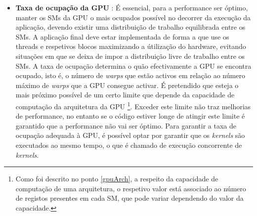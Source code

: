 \begin{itemize}
\item{\textbf{Taxa de ocupação da GPU}} :
É essencial, para a performance ser óptimo, manter os SMs da GPU o mais ocupados possível no decorrer da execução da aplicação, devendo existir uma distribuição de trabalho equilibrada entre os SMs. A aplicação final deve estar implementada de forma a que use os threads e respetivos blocos maximizando a útilização do hardware, evitando situações em que se deixa de impor a distribuição livre de trabalho entre os SMs.
A taxa de ocupação determina o quão efectivamente a GPU se encontra ocupado, isto é, o número de \textit{warps} que estão activos em relação ao número máximo de \textit{warps} que a GPU consegue activar. É pretendido que esteja o mais próximo possível de um certo limite que depende da capacidade de computação da arquitetura da GPU \footnote[3]{Como foi descrito no ponto \ref{gpuArch}, a respeito da capacidade de computação de uma arquitetura, o respetivo valor está associado ao número de registos presentes em cada SM, que pode variar dependendo do valor da capacidade.}. Exceder este limite não traz melhorias de performance, no entanto se o código estiver longe de atingir este limite é garantido que a performance não vai ser óptimo. Para garantir a taxa de ocupação adequada à GPU, é possível optar por garantir que os \textit{kernels} são executados ao mesmo tempo, o que é chamado de execução concorrente de \textit{kernels}. 


\end{itemize}
